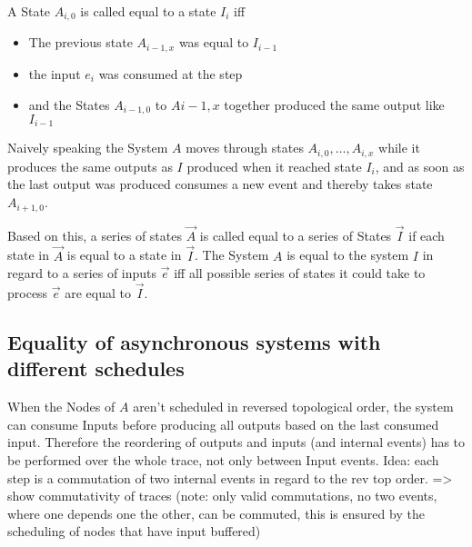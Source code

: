 A State \(A_{i,0}\) is called equal to a state \(I_{i}\) iff

\begin{itemize}
  \item The previous state \(A_{i-1,x}\) was equal to \(I_{i-1}\)
  \item the input \(e_i\) was consumed at the step
  \item and the States \(A_{i-1,0}\) to \(A{i-1,x}\) together produced the same output like \(I_{i-1}\)
\end{itemize}

Naively speaking the System \(A\) moves through states \(A_{i,0},\dots,A_{i,x}\) while it produces the same outputs as \(I\)
produced when it reached state \(I_i\), and as soon as the last output was produced consumes a new event and thereby takes
state \(A_{i+1,0}\).

Based on this, a series of states \(\vec{A}\) is called equal to a series of States \(\vec{I}\) if each state in \(\vec{A}\)
is equal to a state in \(\vec{I}\).
The System \(A\) is equal to the system \(I\) in regard to a series of inputs \(\vec{e}\) iff all possible series of
states it could take to process \(\vec{e}\) are equal to \(\vec{I}\).

\subsection{Equality of asynchronous systems with different schedules}
\label{sec:system:equalitys_without_timing:async_any_async_topological}

When the Nodes of \(A\) aren't scheduled in reversed topological order, the system can consume Inputs before producing all outputs
based on the last consumed input.
Therefore the reordering of outputs and inputs (and internal events) has to be performed over the whole trace, not only between Input events.
Idea: each step is a commutation of two internal events in regard to the rev top order.
=> show commutativity of traces (note: only valid commutations, no two events, where one depends one the other, can be commuted, this is ensured by the scheduling of nodes that have input buffered)




